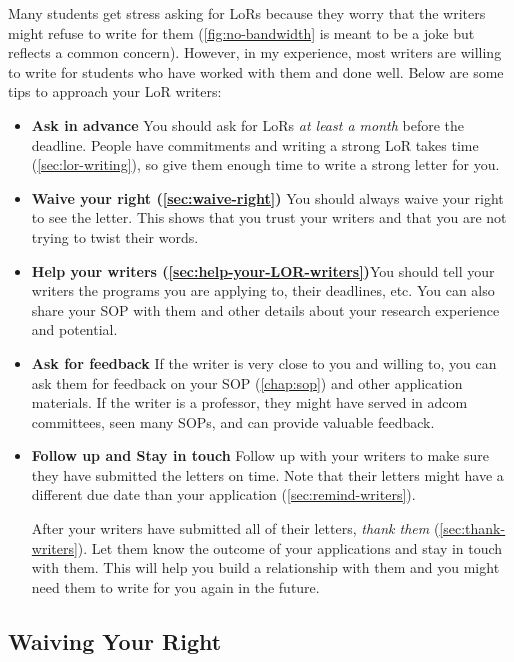 \documentclass[oneside,11pt]{book}
\begin{document}
Many students get stress asking for LoRs because they worry that the writers might refuse to write for them (\autoref{fig:no-bandwidth}  is meant to be a joke but reflects a common concern).  However, in my experience, most writers are willing to write for students who have worked with them and done well. Below are some tips to approach your LoR writers:
\begin{itemize}
\item \textbf{Ask in advance} You should ask for LoRs \emph{at least a month} before the deadline. People have commitments and writing a strong LoR takes time (\autoref{sec:lor-writing}), so give them enough time to write a strong letter for you.

\item \textbf{Waive your right (\autoref{sec:waive-right})} You should always waive your right to see the letter. This shows that you trust your writers and that you are not trying to twist their words.

\item \textbf{Help your writers (\autoref{sec:help-your-LOR-writers})}You should tell your writers the programs you are applying to, their deadlines, etc.  You can also share your SOP with them and other details about your research experience and potential. 




\item \textbf{Ask for feedback} If the writer is very close to you and willing to, you can ask them for feedback on your SOP (\autoref{chap:sop}) and other application materials. If the writer is a professor, they might have served in adcom committees, seen many SOPs, and can provide valuable feedback.

\item \textbf{Follow up and Stay in touch} Follow up with your writers to make sure they have submitted the letters on time. Note that their letters might have a different due date than your application (\autoref{sec:remind-writers}). 

After your writers have submitted all of their letters, \emph{thank them} (\autoref{sec:thank-writers}).  Let them know the outcome of your applications and stay in touch with them.  This will help you build a relationship with them and you might need them to write for you again in the future.
\end{itemize}



\subsection{Waiving Your Right}\label{sec:waive-right}
\end{document}
